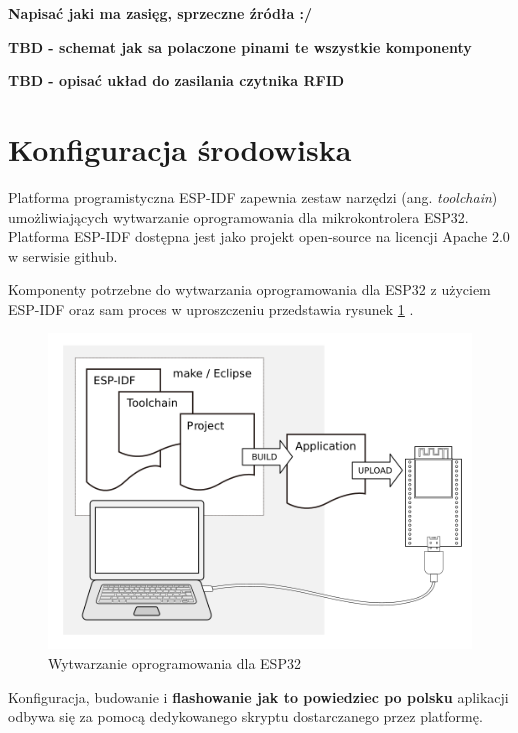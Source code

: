             \textbf{Napisać jaki ma zasięg, sprzeczne źródła :/}

            \textbf{TBD - schemat jak sa polaczone pinami te wszystkie komponenty}

            \textbf{TBD - opisać układ do zasilania czytnika RFID}

    \section{Konfiguracja środowiska}

        Platforma programistyczna ESP-IDF zapewnia zestaw narzędzi (ang. \textit{toolchain}) umożliwiających wytwarzanie oprogramowania dla mikrokontrolera ESP32. Platforma ESP-IDF dostępna jest jako projekt open-source na licencji Apache 2.0 w serwisie github.

        Komponenty potrzebne do wytwarzania oprogramowania dla ESP32 z użyciem ESP-IDF oraz sam proces w uproszczeniu przedstawia rysunek \ref{fig:esp32_dev} \cite{esp-idf-get-started}.

        \begin{figure}[]
            \centering
            \includegraphics[width=\textwidth]{chapters/images/esp32_dev.png}
            \caption{Wytwarzanie oprogramowania dla ESP32}
            \label{fig:esp32_dev}
        \end{figure}

        Konfiguracja, budowanie i \textbf{flashowanie jak to powiedziec po polsku} aplikacji odbywa się za pomocą dedykowanego skryptu dostarczanego przez platformę.

